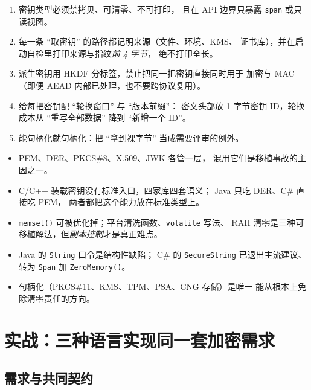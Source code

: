 \documentclass[12pt,a4paper,fontset=fandol]{ctexbook}
\newcommand{\Fn}[1]{\texttt{#1()}}
\newcommand{\Tp}[1]{\texttt{#1}}
\newcommand{\CSharp}{C\#}
\newcommand{\CppJava}{C/C++}
\begin{document}
\begin{bestpractice}[title=密钥材料清单]
\begin{enumerate}
  \item 密钥类型必须禁拷贝、可清零、不可打印，
        且在 API 边界只暴露 \Tp{span} 或只读视图。
  \item 每一条 ``取密钥'' 的路径都记明来源（文件、环境、KMS、
        证书库），并在启动自检里打印来源与指纹\emph{前 4 字节}，
        绝不打印全长。
  \item 派生密钥用 HKDF 分标签，禁止把同一把密钥直接同时用于
        加密与 MAC（即便 AEAD 内部已处理，也不要跨协议复用）。
  \item 给每把密钥配 ``轮换窗口'' 与 ``版本前缀''：
        密文头部放 1 字节密钥 ID，轮换成本从 ``重写全部数据''
        降到 ``新增一个 ID''。
  \item 能句柄化就句柄化：把 ``拿到裸字节'' 当成需要评审的例外。
\end{enumerate}
\end{bestpractice}

\begin{guideline}[title=本章要点]
\begin{itemize}
  \item PEM、DER、PKCS\#8、X.509、JWK 各管一层，
        混用它们是移植事故的主因之一。
  \item \CppJava{} 装载密钥没有标准入口，四家库四套语义；
        Java 只吃 DER、\CSharp{} 直接吃 PEM，
        两者都把这个能力放在标准类型上。
  \item \Fn{memset} 可被优化掉；平台清洗函数、\Tp{volatile} 写法、
        RAII 清零是三种可移植解法，但\emph{副本控制}才是真正难点。
  \item Java 的 \Tp{String} 口令是结构性缺陷；
        \CSharp{} 的 \Tp{SecureString} 已退出主流建议、
        转为 \Tp{Span} 加 \Fn{ZeroMemory}。
  \item 句柄化（PKCS\#11、KMS、TPM、PSA、CNG 存储）是唯一
        能从根本上免除清零责任的方向。
\end{itemize}
\end{guideline}

\chapter{实战：三种语言实现同一套加密需求}

\section{需求与共同契约}
\end{document}
